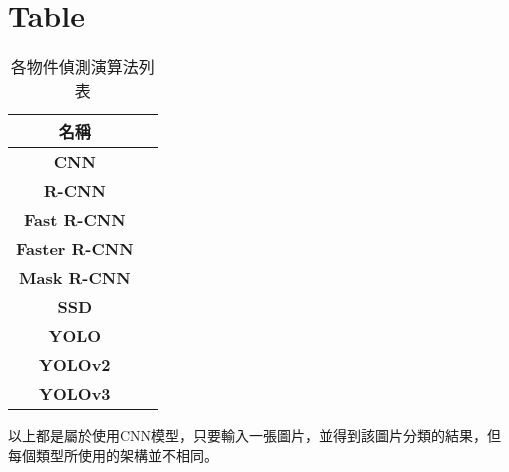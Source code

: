 



\section{Table}
\label{ss:Table}

 \begin{table}[htpb]\begin{center}
	\label{t:prefix-table}
	\caption{各物件偵測演算法列表}
	\renewcommand{\arraystretch}{1.0}
	\begin{tabularx}{300pt}{|c|X| }
		\hline
		\multirow{1}{*}{\textbf{名稱}}
		\\ \hline\hline
    \multirow{1}{*}{\textbf{CNN}}
        \\ \hline
		\multirow{1}{*}{\textbf{R-CNN}}
        \\ \hline
		\multirow{1}{*}{\textbf{Fast R-CNN}}
		\\ \hline
		\multirow{1}{*}{\textbf{Faster R-CNN}}
		\\ \hline
		\multirow{1}{*}{\textbf{Mask R-CNN}}
		\\ \hline
    \multirow{1}{*}{\textbf{SSD}}
		\\ \hline
		\multirow{1}{*}{\textbf{YOLO}}
		\\ \hline
    \multirow{1}{*}{\textbf{YOLOv2}}
		\\ \hline
    \multirow{1}{*}{\textbf{YOLOv3}}
		\\ \hline
	\end{tabularx}
\end{center}
以上都是屬於使用CNN模型，只要輸入一張圖片，並得到該圖片分類的結果，但每個類型所使用的架構並不相同。
\end{table}
